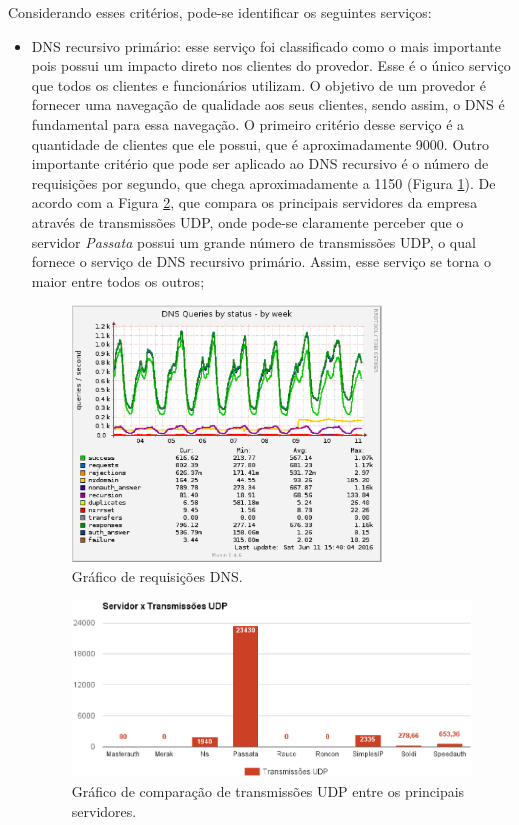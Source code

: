Considerando esses critérios, pode-se identificar os seguintes serviços:
\begin{itemize}
 \item \ac{DNS} recursivo primário: esse serviço foi classificado como o mais importante pois possui um impacto direto nos clientes do provedor. 
 Esse é o único serviço que todos os clientes e funcionários utilizam. O objetivo de um provedor é fornecer uma navegação de qualidade aos seus 
 clientes, sendo assim, o \ac{DNS} é fundamental para essa navegação. O primeiro critério desse serviço é a quantidade de clientes
 que ele possui, que é aproximadamente 9000. Outro importante critério que pode ser aplicado ao \ac{DNS} recursivo é o número de 
 requisições por segundo, que chega aproximadamente a 1150 (Figura \ref{fig:passata_week}). De acordo com a Figura \ref{fig:servico_udp}, que 
 compara os principais servidores da empresa através de transmissões \ac{UDP}, onde pode-se claramente perceber que o servidor \textit{Passata}
 possui um grande número de transmissões \ac{UDP}, o qual fornece o serviço de \ac{DNS} recursivo primário. 
 Assim, esse serviço se torna o maior entre todos os outros;
 
\begin{figure}[h!]
 \centering
 \includegraphics[width=310px]{img/passata_week.eps}
 \caption{Gráfico de requisições DNS.}
 \label{fig:passata_week}
\end{figure}

\begin{figure}[h!]
 \centering
 \includegraphics[width=430px]{img/servico_udp.eps}
 \caption{Gráfico de comparação de transmissões UDP entre os principais servidores.}
 \label{fig:servico_udp}
\end{figure}


\end{itemize}
